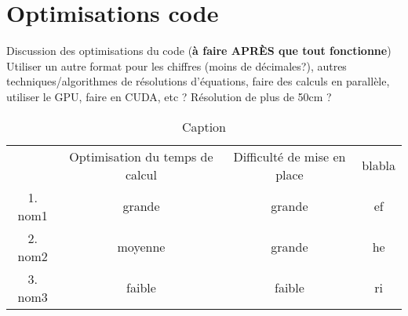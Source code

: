 \chapter{Optimisations code}
\label{chaper-5}

Discussion des optimisations du code (\textbf{à faire APRÈS que tout fonctionne})\\

Utiliser un autre format pour les chiffres (moins de décimales?), autres techniques/algorithmes de résolutions d'équations, faire des calculs en parallèle, utiliser le GPU, faire en CUDA, etc ? Résolution de plus de 50cm ?\\

\begin{table}[h]
    \centering
    \begin{tabular}{c|c|c|c|}
         & Optimisation du temps de calcul & Difficulté de mise en place & blabla\\
         1. nom1 & grande & grande & ef\\
         2. nom2 & moyenne & grande & he\\
         3. nom3 & faible & faible & ri\\
    \end{tabular}
    \caption{Caption}
    \label{tab:my_table}
\end{table}